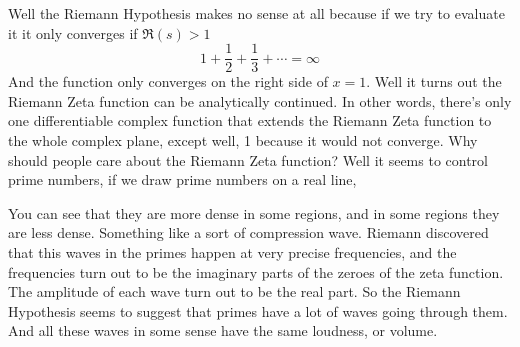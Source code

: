 \documentclass{article}
\begin{document}
\begin{center}
\end{center}
Well the Riemann Hypothesis makes no sense at all because if we try to evaluate it it only converges if
$\Re(s) > 1$
\begin{equation}
	1 + \frac{1}{2} + \frac{1}{3} + \cdots = \infty
\end{equation}
And the function only converges on the right side of $x = 1$. Well it turns out the Riemann Zeta
function can be analytically continued. In other words, there's only one differentiable complex function
that extends the Riemann Zeta function to the whole complex plane, except well, 1 because it would not
converge. Why should people care about the Riemann Zeta function? Well it seems to control prime numbers,
if we draw prime numbers on a real line,
\begin{center}
\end{center}
You can see that they are more dense in some regions, and in some regions
they are less dense. Something like a sort of compression wave. Riemann
discovered that this waves in the primes happen at very precise frequencies,
and the frequencies turn out to be the imaginary parts of the zeroes of the
zeta function. The amplitude of each wave turn out to be the real part. So
the Riemann Hypothesis seems to suggest that primes have a lot of waves going
through them. And all these waves in some sense have the same loudness, or volume.
\end{document}
